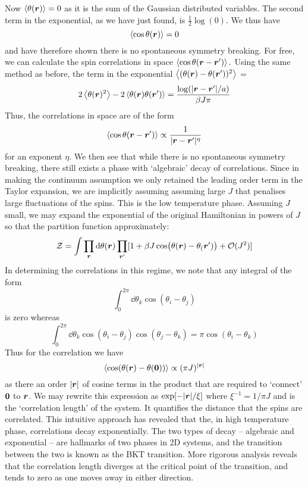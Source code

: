  Now $\left < \theta(\boldsymbol{r}) \right >=0$ as it is the sum of the Gaussian distributed variables. The second term in the exponential, as we have just found, is $\tfrac12 \log(0)$. We thus have
 \[
 \left < \cos \theta(\boldsymbol{r}) \right > = 0
 \]
 and have therefore shown there is no spontaneous symmetry breaking. For free, we can calculate the spin correlations in space $\left < \cos \theta(\boldsymbol{r} - \boldsymbol{r}') \right >.$ Using the same method as before, the term in the exponential $\left < (\theta(\boldsymbol{r}) - \theta(\boldsymbol{r}'))^2 \right >$ = 
 \[
 2\left < \theta(\boldsymbol{r})^2 \right > - 2\left < \theta(\boldsymbol{r})\theta(\boldsymbol{r}') \right > =  \frac{\log(|\boldsymbol{r} - \boldsymbol{r}'|/a)}{\beta J  \pi}
 \]
 Thus, the correlations in space are of the form
\[
\left < \cos \theta (\boldsymbol{r} - \boldsymbol{r}') \right > \propto \frac{1}{|\boldsymbol{r}- \boldsymbol{r}'|^{\eta}}
\]
for an exponent $\eta$. We then see that while there is no spontaneous symmetry breaking, there still exists a phase with `algebraic' decay of correlations. Since in making the continuum assumption we only retained the leading order term in the Taylor expansion, we are implicitly assuming assuming large $J$ that penalises large fluctuations of the spins. This is the low temperature phase. Assuming $J$ small, we may expand the exponential of the original Hamiltonian in powers of $J$ so that the partition function approximately: 
\[
\mathcal{Z} = \int  \prod_{\boldsymbol{r}} \dd{\theta(\boldsymbol{r})} \prod_{\boldsymbol{r}'} [1 + \beta J \cos(\theta(\boldsymbol{r}) - \theta_(\boldsymbol{r}')) + \mathcal{O}(J^2
)]\]
In determining the correlations in this regime, we note that any integral of the form 
\[
\int_{0}^{2\pi} \dd{\theta_k} \cos(\theta_i -\theta_j) 
\]
is zero whereas
\[
\int_{0}^{2\pi} \dd{\theta_k} \cos(\theta_i -\theta_j)\cos(\theta_j - \theta_k)= \pi \cos(\theta_i - \theta_k)
\]
Thus for the correlation we have 
\[
\left < \cos(\theta(\boldsymbol{r})- \theta(\boldsymbol{0})) \right > \propto (\pi J)^{|\boldsymbol{r}|}
\]
as there an order $|\boldsymbol{r}|$ of cosine terms in the product that are required to `connect' $\boldsymbol{0}$ to $\boldsymbol{r}$. 
We may rewrite this expression as $\exp[-|\boldsymbol{r}|/\xi]$ where $\xi^{-1} = 1/\pi J$ and is the `correlation length' of the system. It quantifies the distance that the spins are correlated. This intuitive approach has revealed that the, in high temperature phase, correlations decay exponentially. The two types of decay -- algebraic and exponential -- are hallmarks of two phases in 2D systems, and the transition between the two is known as the BKT transition. More rigorous analysis reveals that the correlation length diverges at the critical point of the transition, and tends to zero as one moves away in either direction. 

